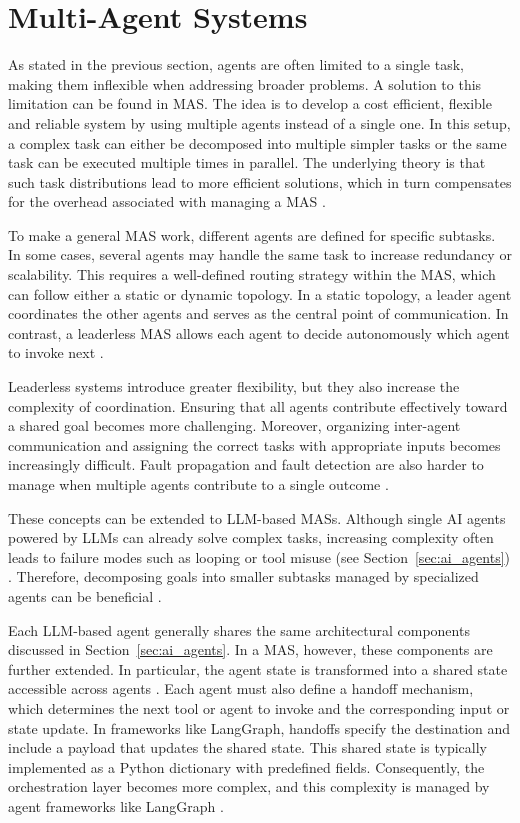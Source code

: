 \documentclass[a4paper,oneside,bibliography=totoc]{scrbook}
\begin{document}
\section{Multi-Agent Systems}
\label{sec:multi_agent_systems}

As stated in the previous section, agents are often limited to a single task, making them inflexible when addressing broader problems. A solution to this limitation can be found in \ac{MAS}. The idea is to develop a cost efficient, flexible and reliable system by using multiple agents instead of a single one. In this setup, a complex task can either be decomposed into multiple simpler tasks or the same task can be executed multiple times in parallel. The underlying theory is that such task distributions lead to more efficient solutions, which in turn compensates for the overhead associated with managing a \ac{MAS} \cite{Dorri2018}.

To make a general \ac{MAS} work, different agents are defined for specific subtasks. In some cases, several agents may handle the same task to increase redundancy or scalability. This requires a well-defined routing strategy within the \ac{MAS}, which can follow either a static or dynamic topology. In a static topology, a leader agent coordinates the other agents and serves as the central point of communication. In contrast, a leaderless \ac{MAS} allows each agent to decide autonomously which agent to invoke next \cite{Dorri2018}.

Leaderless systems introduce greater flexibility, but they also increase the complexity of coordination. Ensuring that all agents contribute effectively toward a shared goal becomes more challenging. Moreover, organizing inter-agent communication and assigning the correct tasks with appropriate inputs becomes increasingly difficult. Fault propagation and fault detection are also harder to manage when multiple agents contribute to a single outcome \cite{Dorri2018}.

These concepts can be extended to \ac{LLM}-based \acp{MAS}. Although single \ac{AI} agents powered by \acp{LLM} can already solve complex tasks, increasing complexity often leads to failure modes such as looping or tool misuse (see Section~\ref{sec:ai_agents}) \cite{OpenAI2025}. Therefore, decomposing goals into smaller subtasks managed by specialized agents can be beneficial \cite{Sapkota2025}.

Each \ac{LLM}-based agent generally shares the same architectural components discussed in Section~\ref{sec:ai_agents}. In a \ac{MAS}, however, these components are further extended. In particular, the agent state is transformed into a shared state accessible across agents \cite{Sapkota2025}. Each agent must also define a handoff mechanism, which determines the next tool or agent to invoke and the corresponding input or state update. In frameworks like LangGraph, handoffs specify the destination and include a payload that updates the shared state. This shared state is typically implemented as a Python dictionary with predefined fields. Consequently, the orchestration layer becomes more complex, and this complexity is managed by agent frameworks like LangGraph \cite{LangChain2025b}.
\end{document}
